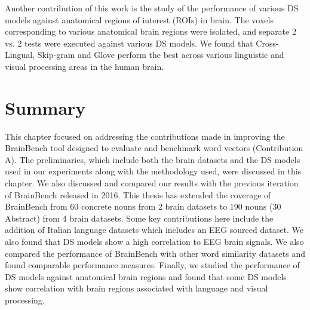 Another contribution of this work is the study of the performance of various DS models against anatomical regions of interest (ROIs) in brain. The voxels corresponding to various anatomical brain regions were isolated, and separate 2 vs. 2 tests were executed against various DS models. We found that Cross-Lingual, Skip-gram and Glove perform the best across various linguistic and visual processing areas in the human brain.

\section{Summary}

This chapter focused on addressing the contributions made in improving the BrainBench tool designed to evaluate and benchmark word vectors (Contribution A). The preliminaries, which include both the brain datasets and the DS models used in our experiments along with the methodology used, were discussed in this chapter. We also discussed and compared our results with the previous iteration of BrainBench released in 2016. This thesis has extended the coverage of BrainBench from 60 concrete nouns from 2 brain datasets to 190 nouns (30 Abstract) from 4 brain datasets. Some key contributions here include the addition of Italian language datasets which includes an EEG sourced dataset. We also found that DS models show a high correlation to EEG brain signals. We also compared the performance of BrainBench with other word similarity datasets and found comparable performance measures. Finally, we studied the performance of DS models against anatomical brain regions and found that some DS models show correlation with brain regions associated with language and visual processing.





